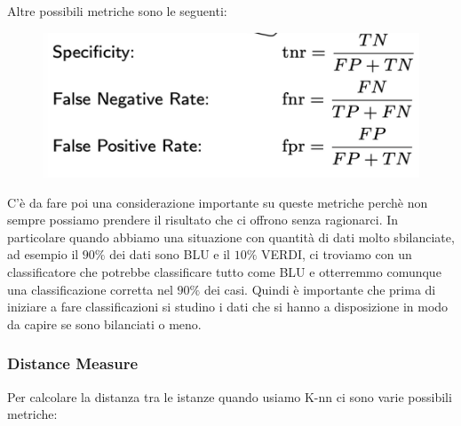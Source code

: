 \documentclass[14pt]{extreport}
\begin{document}
Altre possibili metriche sono le seguenti:


\begin{figure}[H]
	\centering
	\includegraphics[width=0.7\linewidth]{462.jpeg}
\end{figure}

C’è da fare poi una considerazione importante su queste metriche perchè non sempre possiamo prendere il risultato che ci offrono senza ragionarci. In
particolare quando abbiamo una situazione con quantità di dati molto sbilanciate, ad esempio il $90\%$ dei dati sono BLU e il $10\%$ VERDI, ci
troviamo con un classificatore che potrebbe classificare tutto come BLU e otterremmo comunque una classificazione corretta nel $90\%$ dei casi. Quindi
è importante che prima di iniziare a fare classificazioni si studino i dati che si hanno a disposizione in modo da capire se sono bilanciati o meno.


\subsubsection{Distance Measure}

Per calcolare la distanza tra le istanze quando usiamo K-nn ci sono varie possibili metriche:
\end{document}

